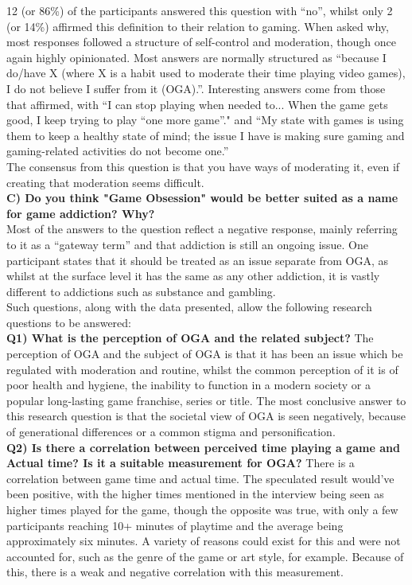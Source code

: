 \documentclass[conference]{IEEEtran}
\begin{document}
12 (or 86\%) of the participants answered this question with “no”, whilst only 2 (or 14\%) affirmed this definition to their relation to gaming. When asked why, most responses followed a structure of self-control and moderation, though once again highly opinionated. Most answers are normally structured as “because I do/have X (where X is a habit used to moderate their time playing video games), I do not believe I suffer from it (OGA).”. Interesting answers come from those that affirmed, with “I can stop playing when needed to... When the game gets good, I keep trying to play “one more game”." and “My state with games is using them to keep a healthy state of mind; the issue I have is making sure gaming and gaming-related activities do not become one.”\\ 

The consensus from this question is that you have ways of moderating it, even if creating that moderation seems difficult.\\

 \textbf{C) Do you think "Game Obsession" would be better suited as a name for game addiction? Why?}\\

Most of the answers to the question reflect a negative response, mainly referring to it as a “gateway term” and that addiction is still an ongoing issue. One participant states that it should be treated as an issue separate from OGA, as whilst at the surface level it has the same as any other addiction, it is vastly different to addictions such as substance and gambling.\\

Such questions, along with the data presented, allow the following research questions to be answered:\\

 \textbf{Q1)  What is the perception of OGA and the related subject?}
The perception of OGA and the subject of OGA is that it has been an issue which be regulated with moderation and routine, whilst the common perception of it is of poor health and hygiene, the inability to function in a modern society or a popular long-lasting game franchise, series or title. The most conclusive answer to this research question is that the societal view of OGA is seen negatively, because of generational differences or a common stigma and personification.\\

 \textbf{Q2) Is there a correlation between perceived time playing a game and Actual time? Is it a suitable measurement for OGA?}
There is a correlation between game time and actual time. The speculated result would’ve been positive, with the higher times mentioned in the interview being seen as higher times played for the game, though the opposite was true, with only a few participants reaching 10+ minutes of playtime and the average being approximately six minutes. A variety of reasons could exist for this and were not accounted for, such as the genre of the game or art style, for example. Because of this, there is a weak and negative correlation with this measurement.
\end{document}
